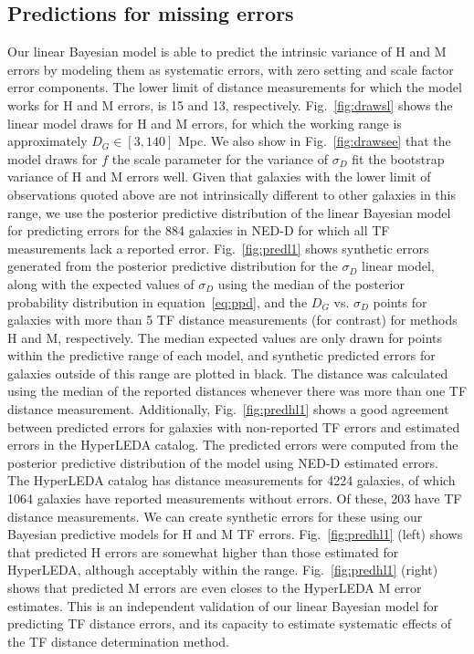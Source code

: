 \documentclass[a4paper,fleqn,usenatbib]{mnras}
\begin{document}
\subsection{Predictions for missing errors}
\label{sec:pred} 
Our linear Bayesian model is able to predict the intrinsic variance of H and M errors by modeling them as systematic errors, with zero setting and scale factor error components. The lower limit of distance measurements for which the model works for H and M errors, is 15 and 13, respectively. Fig.~\ref{fig:drawsl} shows the linear model draws for H and M errors, for which the working range is approximately $D_G\in[3,140]$ Mpc. We also show in Fig.~\ref{fig:drawsee} that the model draws for $f$ the scale parameter for the variance of $\sigma_D$ fit the bootstrap variance of H and M errors well. Given that galaxies with the lower limit of observations quoted above are not intrinsically different to other galaxies in this range, we use the posterior predictive distribution of the linear Bayesian model for predicting errors for the 884 galaxies in NED-D for which all TF measurements lack a reported error. Fig.~\ref{fig:predl1} shows synthetic errors generated from the posterior predictive distribution for the $\sigma_D$ linear model, along with the expected values of $\sigma_D$ using the median of the posterior probability distribution in equation~\ref{eq:ppd}, and the $D_G$ vs. $\sigma_D$ points for galaxies with more than 5 TF distance measurements (for contrast) for methods H and M, respectively. The median expected values are only drawn for points within the predictive range of each model, and synthetic predicted errors for galaxies outside of this range are plotted in black. The distance was calculated using the median of the reported distances whenever there was more than one TF distance measurement. Additionally, Fig.~\ref{fig:predhl1}  shows a good agreement between predicted errors for galaxies with non-reported TF errors and estimated errors in the HyperLEDA catalog. The predicted errors were computed from the posterior predictive distribution of the model using NED-D estimated errors.\\

The HyperLEDA catalog has distance measurements for 4224 galaxies, of which 1064 galaxies have reported measurements without errors. Of these, 203 have TF distance measurements. We can create synthetic errors for these using our Bayesian predictive models for H and M TF errors. Fig.~\ref{fig:predhl1} (left) shows that predicted H errors are somewhat higher than those estimated for HyperLEDA, although acceptably within the range. Fig.~\ref{fig:predhl1} (right) shows that predicted M errors are even closes to the HyperLEDA M error estimates. This is an independent validation of our linear Bayesian model for predicting TF distance errors, and its capacity to estimate systematic effects of the TF distance determination method.\\
\end{document}
